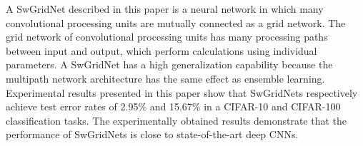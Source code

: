 \documentclass[10pt,twocolumn,letterpaper]{article}
\begin{document}
A SwGridNet described in this paper is a neural network in which many convolutional processing units are mutually connected as a grid network.
The grid network of convolutional processing units has many processing paths between input and output, which perform calculations using individual parameters.
A SwGridNet has a high generalization capability because the multipath network architecture has the same effect as ensemble learning.
Experimental results presented in this paper show that SwGridNets respectively achieve test error rates of 2.95\% and 15.67\% in a CIFAR-10 and CIFAR-100 classification tasks.
The experimentally obtained results demonstrate that the performance of SwGridNets is close to state-of-the-art deep CNNs.

{\small

}
\end{document}
